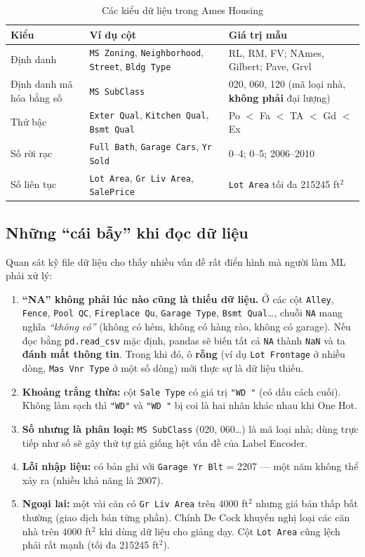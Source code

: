 \begin{table}[H]
\centering
\begin{tabular}{|p{2.8cm}|p{5.4cm}|p{4.8cm}|}
\hline
\textbf{Kiểu} & \textbf{Ví dụ cột} & \textbf{Giá trị mẫu} \\
\hline
Định danh & \texttt{MS Zoning}, \texttt{Neighborhood}, \texttt{Street}, \texttt{Bldg Type} & RL, RM, FV; NAmes, Gilbert; Pave, Grvl \\ \hline
Định danh mã hóa bằng số & \texttt{MS SubClass} & 020, 060, 120 (mã loại nhà, \textbf{không phải} đại lượng) \\ \hline
Thứ bậc & \texttt{Exter Qual}, \texttt{Kitchen Qual}, \texttt{Bsmt Qual} & Po $<$ Fa $<$ TA $<$ Gd $<$ Ex \\ \hline
Số rời rạc & \texttt{Full Bath}, \texttt{Garage Cars}, \texttt{Yr Sold} & 0--4; 0--5; 2006--2010 \\ \hline
Số liên tục & \texttt{Lot Area}, \texttt{Gr Liv Area}, \texttt{SalePrice} & \texttt{Lot Area} tối đa 215245 ft$^2$ \\ \hline
\end{tabular}
\caption{Các kiểu dữ liệu trong Ames Housing}
\end{table}

\subsection{Những ``cái bẫy'' khi đọc dữ liệu}

Quan sát kỹ file dữ liệu cho thấy nhiều vấn đề rất điển hình mà người làm ML phải xử lý:

\begin{enumerate}
    \item \textbf{``NA'' không phải lúc nào cũng là thiếu dữ liệu.} Ở các cột \texttt{Alley}, \texttt{Fence}, \texttt{Pool QC}, \texttt{Fireplace Qu}, \texttt{Garage Type}, \texttt{Bsmt Qual}\ldots, chuỗi \texttt{NA} mang nghĩa \textit{``không có''} (không có hẻm, không có hàng rào, không có garage). Nếu đọc bằng \texttt{pd.read\_csv} mặc định, pandas sẽ biến tất cả \texttt{NA} thành \texttt{NaN} và ta \textbf{đánh mất thông tin}. Trong khi đó, ô \textbf{rỗng} (ví dụ \texttt{Lot Frontage} ở nhiều dòng, \texttt{Mas Vnr Type} ở một số dòng) mới thực sự là dữ liệu thiếu.
    \item \textbf{Khoảng trắng thừa:} cột \texttt{Sale Type} có giá trị \texttt{"WD "} (có dấu cách cuối). Không làm sạch thì \texttt{"WD"} và \texttt{"WD "} bị coi là hai nhãn khác nhau khi One Hot.
    \item \textbf{Số nhưng là phân loại:} \texttt{MS SubClass} (020, 060\ldots) là mã loại nhà; dùng trực tiếp như số sẽ gây thứ tự giả giống hệt vấn đề của Label Encoder.
    \item \textbf{Lỗi nhập liệu:} có bản ghi với \texttt{Garage Yr Blt} = 2207 --- một năm không thể xảy ra (nhiều khả năng là 2007).
    \item \textbf{Ngoại lai:} một vài căn có \texttt{Gr Liv Area} trên 4000 ft$^2$ nhưng giá bán thấp bất thường (giao dịch bán từng phần). Chính De Cock khuyến nghị loại các căn nhà trên 4000 ft$^2$ khi dùng dữ liệu cho giảng dạy. Cột \texttt{Lot Area} cũng lệch phải rất mạnh (tối đa 215245 ft$^2$).
\end{enumerate}

